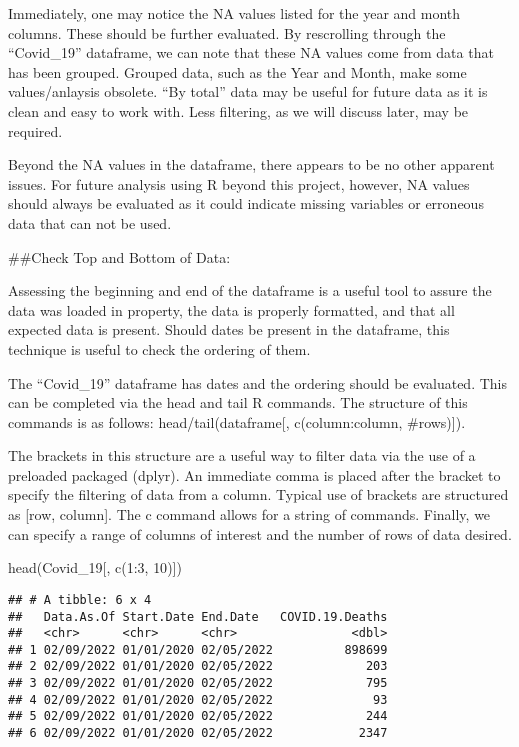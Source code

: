 \documentclass[
]{article}
\newenvironment{Shaded}{\begin{snugshade}}{\end{snugshade}}
\newcommand{\DecValTok}[1]{\textcolor[rgb]{0.00,0.00,0.81}{#1}}
\newcommand{\FunctionTok}[1]{\textcolor[rgb]{0.00,0.00,0.00}{#1}}
\newcommand{\NormalTok}[1]{#1}
\newcommand{\SpecialCharTok}[1]{\textcolor[rgb]{0.00,0.00,0.00}{#1}}
\begin{document}
Immediately, one may notice the NA values listed for the year and month
columns. These should be further evaluated. By rescrolling through the
``Covid\_19'' dataframe, we can note that these NA values come from data
that has been grouped. Grouped data, such as the Year and Month, make
some values/anlaysis obsolete. ``By total'' data may be useful for
future data as it is clean and easy to work with. Less filtering, as we
will discuss later, may be required.

Beyond the NA values in the dataframe, there appears to be no other
apparent issues. For future analysis using R beyond this project,
however, NA values should always be evaluated as it could indicate
missing variables or erroneous data that can not be used.

\#\#Check Top and Bottom of Data:

Assessing the beginning and end of the dataframe is a useful tool to
assure the data was loaded in property, the data is properly formatted,
and that all expected data is present. Should dates be present in the
dataframe, this technique is useful to check the ordering of them.

The ``Covid\_19'' dataframe has dates and the ordering should be
evaluated. This can be completed via the head and tail R commands. The
structure of this commands is as follows: head/tail(dataframe{[},
c(column:column, \#rows){]}).

The brackets in this structure are a useful way to filter data via the
use of a preloaded packaged (dplyr). An immediate comma is placed after
the bracket to specify the filtering of data from a column. Typical use
of brackets are structured as {[}row, column{]}. The c command allows
for a string of commands. Finally, we can specify a range of columns of
interest and the number of rows of data desired.

\begin{Shaded}
\begin{Highlighting}[]
\FunctionTok{head}\NormalTok{(Covid\_19[, }\FunctionTok{c}\NormalTok{(}\DecValTok{1}\SpecialCharTok{:}\DecValTok{3}\NormalTok{, }\DecValTok{10}\NormalTok{)])}
\end{Highlighting}
\end{Shaded}

\begin{verbatim}
## # A tibble: 6 x 4
##   Data.As.Of Start.Date End.Date   COVID.19.Deaths
##   <chr>      <chr>      <chr>                <dbl>
## 1 02/09/2022 01/01/2020 02/05/2022          898699
## 2 02/09/2022 01/01/2020 02/05/2022             203
## 3 02/09/2022 01/01/2020 02/05/2022             795
## 4 02/09/2022 01/01/2020 02/05/2022              93
## 5 02/09/2022 01/01/2020 02/05/2022             244
## 6 02/09/2022 01/01/2020 02/05/2022            2347
\end{verbatim}
\end{document}
